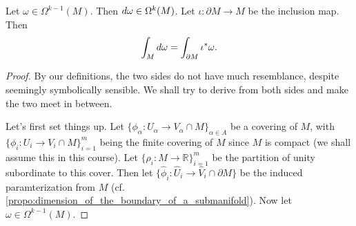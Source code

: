 \documentclass[notoc,notitlepage]{tufte-book}
\begin{document}
\begin{thm}\label{thm:stokes_theorem}
  Let $\omega \in \Omega^{k-1}(M)$. Then $\mathop{}\!d{\omega} \in \Omega^k(M)$. Let
  $\iota : \partial M \to M$ be the inclusion map. Then
  \begin{equation*}
    \int_{M} \mathop{}\!d{\omega} = \int_{\partial M} \iota^* \omega.
  \end{equation*}
\end{thm}

\begin{proof}
  By our definitions, the two sides do not have much resemblance, despite
  seemingly symbolically sensible. We shall try to derive from both sides and
  make the two meet in between.

  Let's first set things up. Let $\{ \phi_\alpha : U_\alpha \to V_\alpha \cap M
  \}_{\alpha \in A}$ be a covering of $M$, with $\{ \phi_i : U_i \to V_i \cap
  M \}_{i=1}^{m}$ being the finite covering of $M$ since $M$ is compact (we shall
  assume this in this course). Let $\{ \rho_i : M
  \to \mathbb{R} \}_{i=1}^{m}$ be the partition of unity subordinate to this
  cover. Then let $\{ \hat{\phi}_i : \hat{U}_i \to \hat{V}_i \cap \partial M
  \}$ be the induced paramterization from $M$ (cf.
  \cref{propo:dimension_of_the_boundary_of_a_submanifold}). Now let $\omega \in
  \Omega^{k-1}(M)$.


\end{proof}
\end{document}
